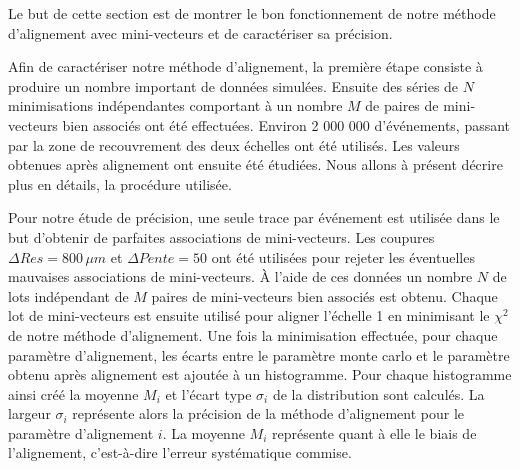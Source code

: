 %   
%   
  
  
  Le but de cette section est de montrer le bon fonctionnement de notre m\'ethode d'alignement avec mini-vecteurs et de caract\'eriser sa pr\'ecision.
  
  \medskip
  
  Afin de caract\'eriser notre m\'ethode d'alignement, la premi\`ere \'etape consiste \`a produire un nombre important de donn\'ees simul\'ees. Ensuite des s\'eries de $N$ minimisations ind\'ependantes comportant \`a un nombre $M$ de paires de mini-vecteurs bien associ\'es ont \'et\'e effectu\'ees. Environ 2 000 000 d'\'ev\'enements, passant par la zone de recouvrement des deux \'echelles ont \'et\'e utilis\'es. Les valeurs obtenues apr\`es alignement ont ensuite \'et\'e \'etudi\'ees. Nous allons \`a pr\'esent d\'ecrire plus en d\'etails, la proc\'edure utilis\'ee.
  
  \medskip
  
  Pour notre \'etude de pr\'ecision, une seule trace par \'ev\'enement est utilis\'ee dans le but d'obtenir de parfaites associations de mini-vecteurs. Les coupures $\Delta Res = 800 \, \mu m$ et $\Delta Pente = 50$ ont \'et\'e utilis\'ees pour rejeter les \'eventuelles mauvaises associations de mini-vecteurs. \`A l'aide de ces donn\'ees un nombre $N$ de lots ind\'ependant de $M$ paires de mini-vecteurs bien associ\'es est obtenu. Chaque lot de mini-vecteurs est ensuite utilis\'e pour aligner l'\'echelle 1 en minimisant le $\chi^2$ de notre m\'ethode d'alignement. Une fois la minimisation effectu\'ee, pour chaque param\`etre d'alignement, les \'ecarts entre le param\`etre monte carlo et le param\`etre obtenu apr\`es alignement est ajout\'ee \`a un histogramme. Pour chaque histogramme ainsi cr\'e\'e la moyenne $M_i$ et l'\'ecart type $\sigma_i$ de la distribution sont calcul\'es. La largeur $\sigma_i$ repr\'esente alors la pr\'ecision de la m\'ethode d'alignement pour le param\`etre d'alignement $i$. La moyenne $M_i$ repr\'esente quant \`a elle le biais de l'alignement, c'est-\`a-dire l'erreur syst\'ematique commise.
  
